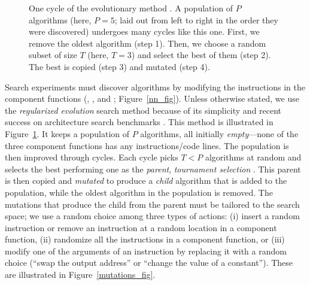 \begin{figure}[!t]
\caption{One cycle of the evolutionary method \cite{goldberg1991comparative,real2018regularized}. A population of $P$ algorithms (here, $P\!\!=\!\!5$; laid out from left to right in the order they were discovered) undergoes many cycles like this one. First, we remove the oldest algorithm (step 1). Then, we choose a random subset of size $T$ (here, $T\!\!=\!\!3$) and select the best of them (step 2). The best is copied (step 3) and mutated (step 4).
}
\label{evolutionary_method_fig}
\end{figure}

Search experiments must discover algorithms by modifying the instructions in the component functions (\setup, \predict, and \learn; \eg Figure~\ref{nn_fig}). Unless otherwise stated, we use the \textit{regularized evolution} search method because of its simplicity and recent success on architecture search benchmarks \cite{real2018regularized,ying2019bench,So2019TheET}. This method is illustrated in Figure~\ref{evolutionary_method_fig}. It keeps a population of $P$ algorithms, all initially \textit{empty}---\ie none of the three component functions has any instructions/code lines. The population is then improved through cycles. Each cycle picks $T\!\!<\!P$ algorithms at random and selects the best performing one as the \textit{parent}, \ie \emph{tournament selection} \cite{goldberg1991comparative}. This parent is then copied and \textit{mutated} to produce a \textit{child} algorithm that is added to the population, while the oldest algorithm in the population is removed. The mutations that produce the child from the parent must be tailored to the search space; we use a random choice among three types of actions: (i) insert a random instruction or remove an instruction at a random location in a component function, (ii) randomize all the instructions in a component function, or (iii) modify one of the arguments of an instruction by replacing it with a random choice (\eg ``swap the output address'' or ``change the value of a constant''). These are illustrated in Figure~\ref{mutations_fig}.

